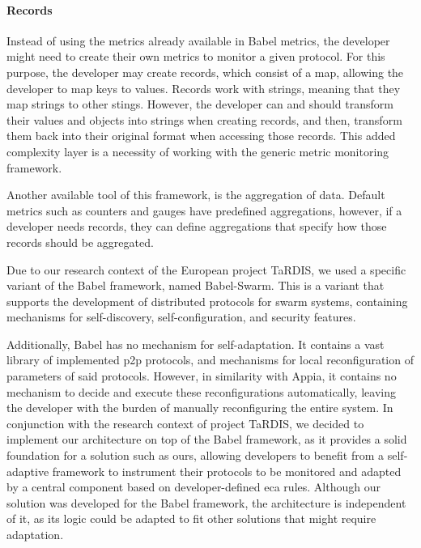 \paragraph{Records} \label{par:records} Instead of using the metrics already available in Babel metrics, the developer might need to create their own metrics to monitor a given protocol. For this purpose, the developer may create records, which consist of a map, allowing the developer to map keys to values. Records work with strings, meaning that they map strings to other stings. However, the developer can and should transform their values and objects into strings when creating records, and then, transform them back into their original format when accessing those records. This added complexity layer is a necessity of working with the generic metric monitoring framework.

Another available tool of this framework, is the aggregation of data. Default metrics such as counters and gauges have predefined aggregations, however, if a developer needs records, they can define aggregations that specify how those records should be aggregated. 

Due to our research context of the European project TaRDIS\cite{TARDIS2023}, we used a specific variant of the Babel framework, named Babel-Swarm\cite{Fouto2022,Galvao2024}. This is a variant that supports the development of distributed protocols for swarm systems, containing mechanisms for self-discovery, self-configuration, and security features.

Additionally, Babel has no mechanism for self-adaptation. It contains a vast library of implemented \gls{p2p} protocols, and mechanisms for local reconfiguration of parameters of said protocols. However, in similarity with Appia, it contains no mechanism to decide and execute these reconfigurations automatically, leaving the developer with the burden of manually reconfiguring the entire system. In conjunction with the research context of project TaRDIS\cite{TARDIS2023}, we decided to implement our architecture on top of the Babel framework, as it provides a solid foundation for a solution such as ours,  allowing developers to benefit from a self-adaptive framework to instrument their protocols to be monitored and adapted by a central component based on developer-defined \gls{eca} rules. Although our solution was developed for the Babel framework, the architecture is independent of it, as its logic could be adapted to fit other solutions that might require adaptation.

